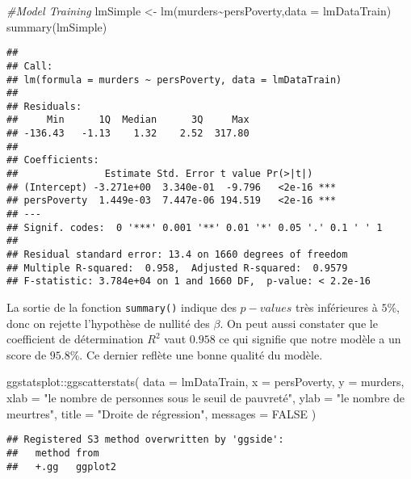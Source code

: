 \documentclass[
]{book}
\newenvironment{Shaded}{\begin{snugshade}}{\end{snugshade}}
\newcommand{\AttributeTok}[1]{\textcolor[rgb]{0.77,0.63,0.00}{#1}}
\newcommand{\CommentTok}[1]{\textcolor[rgb]{0.56,0.35,0.01}{\textit{#1}}}
\newcommand{\ConstantTok}[1]{\textcolor[rgb]{0.00,0.00,0.00}{#1}}
\newcommand{\FunctionTok}[1]{\textcolor[rgb]{0.00,0.00,0.00}{#1}}
\newcommand{\NormalTok}[1]{#1}
\newcommand{\OtherTok}[1]{\textcolor[rgb]{0.56,0.35,0.01}{#1}}
\newcommand{\SpecialCharTok}[1]{\textcolor[rgb]{0.00,0.00,0.00}{#1}}
\newcommand{\StringTok}[1]{\textcolor[rgb]{0.31,0.60,0.02}{#1}}
\begin{document}
\begin{Shaded}
\begin{Highlighting}[]
\CommentTok{\#Model Training}
\NormalTok{lmSimple }\OtherTok{\textless{}{-}} \FunctionTok{lm}\NormalTok{(murders}\SpecialCharTok{\textasciitilde{}}\NormalTok{persPoverty,}\AttributeTok{data =}\NormalTok{ lmDataTrain)}
\FunctionTok{summary}\NormalTok{(lmSimple)}
\end{Highlighting}
\end{Shaded}

\begin{verbatim}
## 
## Call:
## lm(formula = murders ~ persPoverty, data = lmDataTrain)
## 
## Residuals:
##     Min      1Q  Median      3Q     Max 
## -136.43   -1.13    1.32    2.52  317.80 
## 
## Coefficients:
##               Estimate Std. Error t value Pr(>|t|)    
## (Intercept) -3.271e+00  3.340e-01  -9.796   <2e-16 ***
## persPoverty  1.449e-03  7.447e-06 194.519   <2e-16 ***
## ---
## Signif. codes:  0 '***' 0.001 '**' 0.01 '*' 0.05 '.' 0.1 ' ' 1
## 
## Residual standard error: 13.4 on 1660 degrees of freedom
## Multiple R-squared:  0.958,  Adjusted R-squared:  0.9579 
## F-statistic: 3.784e+04 on 1 and 1660 DF,  p-value: < 2.2e-16
\end{verbatim}

La sortie de la fonction \texttt{summary()} indique des \(p-values\) très inférieures à \(5\%\), donc on rejette l'hypothèse de nullité des \(\beta\). On peut aussi constater que le coefficient de détermination \(R^2\) vaut \(0.958\) ce qui signifie que notre modèle a un score de \(95.8\%\). Ce dernier reflète une bonne qualité du modèle.\\

\begin{Shaded}
\begin{Highlighting}[]
\NormalTok{ggstatsplot}\SpecialCharTok{::}\FunctionTok{ggscatterstats}\NormalTok{(}
  \AttributeTok{data =}\NormalTok{ lmDataTrain, }
  \AttributeTok{x =}\NormalTok{ persPoverty, }
  \AttributeTok{y =}\NormalTok{ murders,}
  \AttributeTok{xlab  =} \StringTok{"le nombre de personnes sous le seuil de pauvreté"}\NormalTok{,}
  \AttributeTok{ylab  =} \StringTok{"le nombre de meurtres"}\NormalTok{,}
  \AttributeTok{title =} \StringTok{"Droite de régression"}\NormalTok{,}
  \AttributeTok{messages =} \ConstantTok{FALSE}
\NormalTok{)}
\end{Highlighting}
\end{Shaded}

\begin{verbatim}
## Registered S3 method overwritten by 'ggside':
##   method from   
##   +.gg   ggplot2
\end{verbatim}
\end{document}

